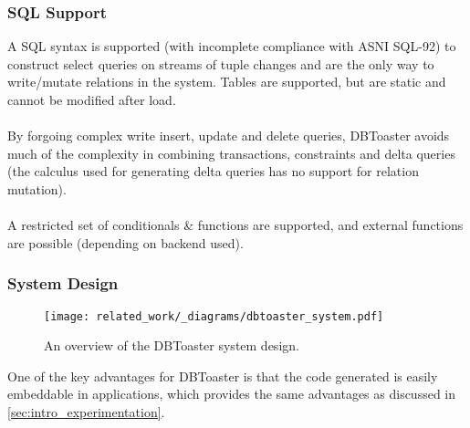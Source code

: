 \subsubsection{SQL Support}
A SQL syntax is supported (with incomplete compliance with ASNI SQL-92) to construct select queries
on streams\cite{DBToasterSQLReference} of tuple changes and are the only way to write/mutate relations in the system.
Tables are supported, but are static and cannot be modified after load.
\\
\\ By forgoing complex write insert, update and delete queries, DBToaster avoids much of the complexity in combining
transactions, constraints and delta queries (the calculus used for generating delta queries has no support for
relation mutation).
\\
\\ A restricted set of conditionals \& functions are supported, and external functions are possible (depending on backend used).

\subsubsection{System Design}
\begin{figure}[h!]
    \centering
    \texttt{[image: related\_work/\_diagrams/dbtoaster\_system.pdf]}
    \caption{An overview of the DBToaster system design.}
\end{figure}
One of the key advantages for DBToaster is that the code generated is easily embeddable in applications, which provides the same advantages as discussed in \ref{sec:intro_experimentation}.

